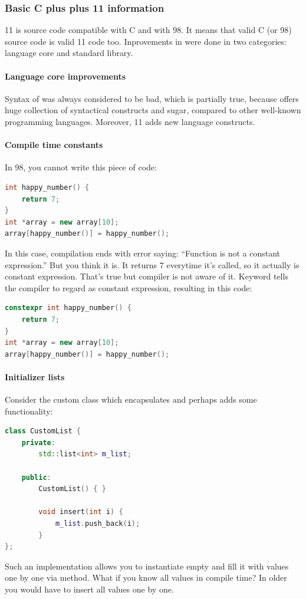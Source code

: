 \subsubsection{Basic C plus plus 11 information}
\cpp{} 11 is source code compatible with C and with \cpp{} 98. It means that valid C (or \cpp{} 98) source code is valid \cpp{} 11 code too. Inprovements in \cpp{} were done in two categories: language core and standard library.

\paragraph{Language core improvements}
Syntax of \cpp{} was always considered to be bad, which is partially true, because \cpp{} offers huge collection of syntactical constructs and sugar, compared to other well-known programming languages. Moreover, \cpp{} 11 adds new language constructs.

\paragraph*{Compile time constants}
In \cpp{} 98, you cannot write this piece of code:
\begin{lstlisting}[firstnumber=1,language=cpp]
int happy_number() {
	return 7;
}
int *array = new array[10];
array[happy_number()] = happy_number();
\end{lstlisting}
In this case, compilation ends with error saying: \enquote{Function  is not a constant expression.} But you think it is. It returns $7$ everytime it's called, so it actually is constant expression. That's true but compiler is not aware of it. Keyword tells the compiler to regard as constant expression, resulting in this code:
\begin{lstlisting}[firstnumber=1,language=cpp]
constexpr int happy_number() {
	return 7;
}
int *array = new array[10];
array[happy_number()] = happy_number();
\end{lstlisting}

\paragraph*{Initializer lists}
Consider the custom class which encapsulates and perhaps adds some functionality:
\begin{lstlisting}[firstnumber=1,language=cpp]
class CustomList {
	private:
		std::list<int> m_list;
	
	public:
		CustomList() { }
		
		void insert(int i) {
			m_list.push_back(i);		
		}
};
\end{lstlisting}
Such an implementation allows you to instantiate empty and fill it with values one by one via method. What if you know all values in compile time? In older \cpp{} you would have to insert all values one by one.

